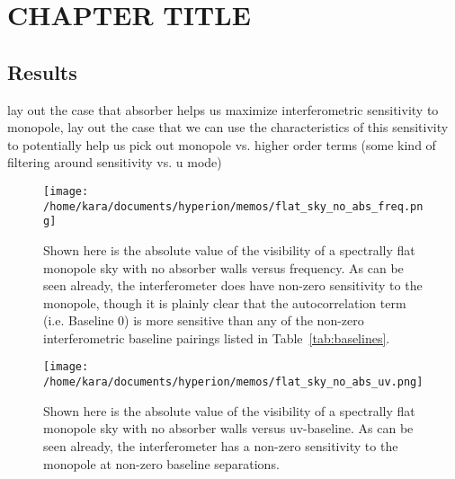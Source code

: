 \chapter{CHAPTER TITLE}

\section{Results}

lay out the case that absorber helps us maximize interferometric sensitivity to 
monopole, lay out the case that we can use the characteristics of this 
sensitivity to potentially help us pick out monopole vs. higher order terms 
(some kind of filtering around sensitivity vs. u mode)

\begin{figure}
    \begin{center}
    \texttt{[image: /home/kara/documents/hyperion/memos/flat\_sky\_no\_abs\_freq.png]}
    \end{center}
    \caption{
        Shown here is the absolute value of the visibility of a spectrally flat 
        monopole sky with no absorber walls versus frequency. As can be seen 
        already, the interferometer does have non-zero sensitivity to the 
        monopole, though it is plainly clear that the autocorrelation term 
        (i.e. Baseline 0) is more sensitive than any of the non-zero 
        interferometric baseline pairings listed in Table~\ref{tab:baselines}.
    }
    \label{fig:flat-sky-no-abs-freq}
\end{figure}

\begin{figure}
    \begin{center}
    \texttt{[image: /home/kara/documents/hyperion/memos/flat\_sky\_no\_abs\_uv.png]}
    \end{center}
    \caption{
        Shown here is the absolute value of the visibility of a spectrally flat 
        monopole sky with no absorber walls versus uv-baseline. As can be seen 
        already, the interferometer has a non-zero sensitivity to the monopole 
        at non-zero baseline separations.
    }
    \label{fig:flat-sky-no-abs-uv}
\end{figure}
